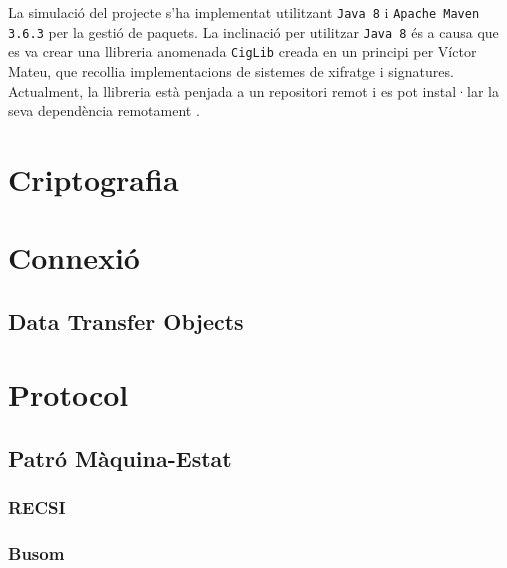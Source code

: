 \newcommand{\java}{Java 8}
\newcommand{\maven}{Apache Maven 3.6.3}

La simulació del projecte s'ha implementat utilitzant \texttt{\java} i \texttt{\maven} per la gestió de paquets. La inclinació per utilitzar \texttt{\java} és a causa que es va crear una llibreria anomenada \texttt{CigLib} creada en un principi per Víctor Mateu, que recollia implementacions de sistemes de xifratge i signatures. Actualment, la llibreria està penjada a un repositori remot i es pot instal·lar la seva dependència remotament \cite{ciglib}.
\section{Criptografia}

\section{Connexió}
\subsection{Data Transfer Objects}
\section{Protocol}
\subsection{Patró Màquina-Estat}
\subsubsection{RECSI}
\subsubsection{Busom}

